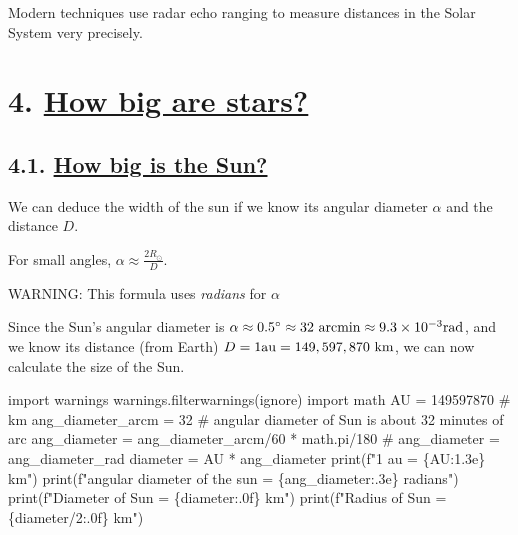 \documentclass[
  letterpaper,
  DIV=11,
  numbers=noendperiod]{scrreprt}
\newenvironment{Shaded}{\begin{snugshade}}{\end{snugshade}}
\newcommand{\BuiltInTok}[1]{\textcolor[rgb]{0.00,0.23,0.31}{#1}}
\newcommand{\CommentTok}[1]{\textcolor[rgb]{0.37,0.37,0.37}{#1}}
\newcommand{\DecValTok}[1]{\textcolor[rgb]{0.68,0.00,0.00}{#1}}
\newcommand{\ImportTok}[1]{\textcolor[rgb]{0.00,0.46,0.62}{#1}}
\newcommand{\NormalTok}[1]{\textcolor[rgb]{0.00,0.23,0.31}{#1}}
\newcommand{\OperatorTok}[1]{\textcolor[rgb]{0.37,0.37,0.37}{#1}}
\newcommand{\SpecialCharTok}[1]{\textcolor[rgb]{0.37,0.37,0.37}{#1}}
\newcommand{\SpecialStringTok}[1]{\textcolor[rgb]{0.13,0.47,0.30}{#1}}
\newcommand{\StringTok}[1]{\textcolor[rgb]{0.13,0.47,0.30}{#1}}
\begin{document}
Modern techniques use radar echo ranging to measure distances in the
Solar System very precisely.

\hypertarget{how-big-are-stars}{%
\chapter{\texorpdfstring{4. \protect\hyperlink{toc0_}{How big are
stars?}}{4. How big are stars?}}\label{how-big-are-stars}}

\hypertarget{how-big-is-the-sun}{%
\section{\texorpdfstring{4.1. \protect\hyperlink{toc0_}{How big is the
Sun?}}{4.1. How big is the Sun?}}\label{how-big-is-the-sun}}

We can deduce the width of the sun if we know its angular diameter
\(\alpha\) and the distance \(D\).

For small angles, \(\alpha \approx \frac{2R_\odot}{D}\).

WARNING: This formula uses \emph{radians} for \(\alpha\)

Since the Sun's angular diameter is
\(\alpha\approx 0.5^\circ \approx 32 \ \rm{arcmin} \approx 9.3\times 10^{-3} \rm{rad}\),
and we know its distance (from Earth)
\(D = 1 \rm{au} = 149,597,870 \ \rm{km}\), we can now calculate the size
of the Sun.

\begin{Shaded}
\begin{Highlighting}[]
\ImportTok{import}\NormalTok{ warnings}
\NormalTok{warnings.filterwarnings(}\StringTok{\textquotesingle{}ignore\textquotesingle{}}\NormalTok{)}
\ImportTok{import}\NormalTok{ math}
\NormalTok{AU }\OperatorTok{=} \DecValTok{149597870} \CommentTok{\# km}
\NormalTok{ang\_diameter\_arcm }\OperatorTok{=} \DecValTok{32} \CommentTok{\# angular diameter of Sun is about 32 minutes of arc}
\NormalTok{ang\_diameter }\OperatorTok{=}\NormalTok{ ang\_diameter\_arcm}\OperatorTok{/}\DecValTok{60} \OperatorTok{*}\NormalTok{ math.pi}\OperatorTok{/}\DecValTok{180} 
\CommentTok{\# ang\_diameter = ang\_diameter\_rad}
\NormalTok{diameter }\OperatorTok{=}\NormalTok{ AU }\OperatorTok{*}\NormalTok{ ang\_diameter}
\BuiltInTok{print}\NormalTok{(}\SpecialStringTok{f"1 au = }\SpecialCharTok{\{}\NormalTok{AU}\SpecialCharTok{:1.3e\}}\SpecialStringTok{ km"}\NormalTok{)}
\BuiltInTok{print}\NormalTok{(}\SpecialStringTok{f"angular diameter of the sun =  }\SpecialCharTok{\{}\NormalTok{ang\_diameter}\SpecialCharTok{:.3e\}}\SpecialStringTok{ radians"}\NormalTok{)}
\BuiltInTok{print}\NormalTok{(}\SpecialStringTok{f"Diameter of Sun = }\SpecialCharTok{\{}\NormalTok{diameter}\SpecialCharTok{:.0f\}}\SpecialStringTok{ km"}\NormalTok{)}
\BuiltInTok{print}\NormalTok{(}\SpecialStringTok{f"Radius of Sun = }\SpecialCharTok{\{}\NormalTok{diameter}\OperatorTok{/}\DecValTok{2}\SpecialCharTok{:.0f\}}\SpecialStringTok{ km"}\NormalTok{)}
\end{Highlighting}
\end{Shaded}
\end{document}
